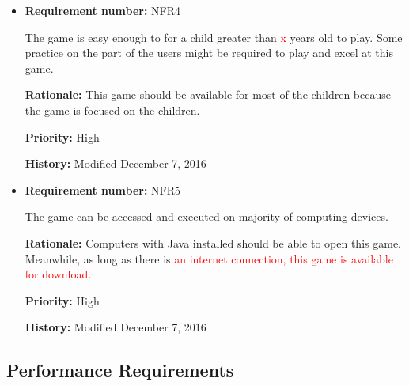 \documentclass[12pt,letterpaper]{article}
\begin{document}
\begin{reqbox}
	\begin{itemize}
 	
 	\item \textbf{Requirement number: }NFR4
 	
   	The game is easy enough to for a child greater than \textcolor{red}{x} years old to play. Some practice on the part of the users might be required to play and excel at this game.

		\textbf{Rationale: } This game should be available for most of the children because the game is focused on the children.

		\textbf{Priority: }High

		\textbf{History: }Modified December 7, 2016

	\end{itemize}
\end{reqbox}

\begin{reqbox}
	\begin{itemize}

 	\subsubsection{Accessibility Requirements}
 	
 	\item \textbf{Requirement number: }NFR5
 	
	The game can be accessed and executed on majority of computing devices. 

		\textbf{Rationale: } Computers with Java installed should be able to open this game. Meanwhile, as long as there is \textcolor{red}{an internet connection, this game is available for download}.

		\textbf{Priority: }High

		\textbf{History: }Modified December 7, 2016
	

	\end{itemize}
\end{reqbox}


\subsection{Performance Requirements}
\end{document}
